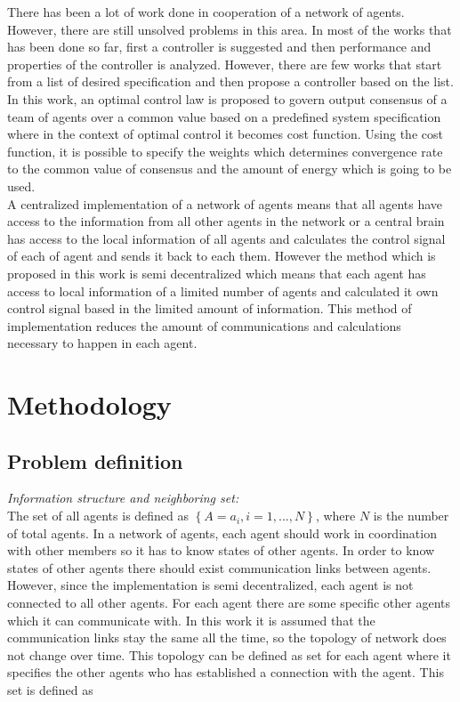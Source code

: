 \documentclass[conference]{IEEEtran}
\begin{document}
There has been a lot of work done in cooperation of a network of agents. However, there are still unsolved problems in this area. In most of the works that has been done so far, first a controller is suggested and then performance and properties of the controller is analyzed. However, there are few works that start from a list of desired specification and then propose a controller based on the list. In this work, an optimal control law is proposed to govern  output consensus of a team of agents over a common value based on a predefined system specification where in the context of optimal control it becomes cost function. Using the cost function, it is possible to specify the weights which determines convergence rate to the common value of consensus and the amount of energy which is going to be used. \\
A centralized implementation of a network of agents means that all agents have access to the information from all other agents in the network or a central brain has access to the local information of all agents and calculates the control signal of each of agent and sends it back to each them. However the method which is proposed in this work is semi decentralized which means that each agent has access to local information of a limited number of agents and calculated it own control signal based in the limited amount of information. This method of implementation reduces the amount of communications and calculations necessary to happen in each agent.

\section{Methodology}

\subsection{Problem definition}
\textit{Information structure and neighboring set:}\\
The set of all agents is defined as $ \left\{ A=a_{i}, i=1,...,N\right\} $, where $N$ is the number of total agents. In a network of agents, each agent should work in coordination with other members so it has to know states of other agents. In order to know states of other agents there should exist communication links between agents. However, since the implementation is semi decentralized, each agent is not connected to all other agents. For each agent there are some specific other agents which it can communicate with. In this work it is assumed that the communication links stay the same all the time, so the topology of network does not change over time. This topology can be defined as set for each agent where it specifies the other agents who has established a connection with the agent. This set is defined as
\end{document}
